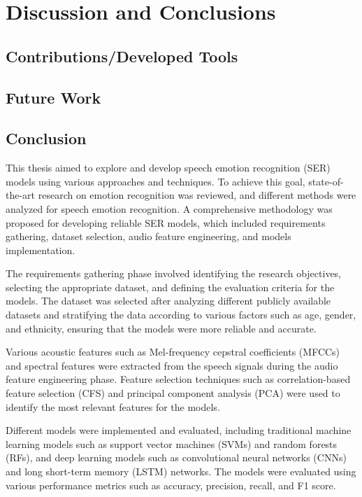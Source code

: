 \chapter{Discussion and Conclusions}
\label{chapter:conc}

\section{Contributions/Developed Tools}

\section{Future Work}

\section{Conclusion}

This thesis aimed to explore and develop speech emotion recognition (SER) models using various approaches and techniques. To achieve this goal, state-of-the-art research on emotion recognition was reviewed, and different methods were analyzed for speech emotion recognition. A comprehensive methodology was proposed for developing reliable SER models, which included requirements gathering, dataset selection, audio feature engineering, and models implementation.

The requirements gathering phase involved identifying the research objectives, selecting the appropriate dataset, and defining the evaluation criteria for the models. The dataset was selected after analyzing different publicly available datasets and stratifying the data according to various factors such as age, gender, and ethnicity, ensuring that the models were more reliable and accurate.

Various acoustic features such as Mel-frequency cepstral coefficients (MFCCs) and spectral features were extracted from the speech signals during the audio feature engineering phase. Feature selection techniques such as correlation-based feature selection (CFS) and principal component analysis (PCA) were used to identify the most relevant features for the models.

Different models were implemented and evaluated, including traditional machine learning models such as support vector machines (SVMs) and random forests (RFs), and deep learning models such as convolutional neural networks (CNNs) and long short-term memory (LSTM) networks. The models were evaluated using various performance metrics such as accuracy, precision, recall, and F1 score.

